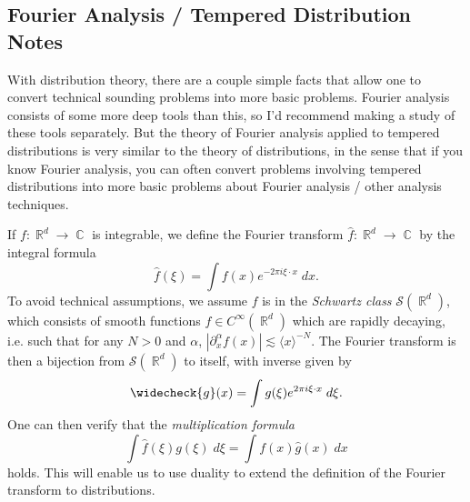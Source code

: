 \documentclass[answers]{exam}
\DeclareMathOperator{\CC}{\mathbb{C}}
\DeclareMathOperator{\RR}{\mathbb{R}}
\begin{document}
\begin{questions}
\newpage
\section{Fourier Analysis / Tempered Distribution Notes}

With distribution theory, there are a couple simple facts that allow one to convert technical sounding problems into more basic problems. Fourier analysis consists of some more deep tools than this, so I'd recommend making a study of these tools separately. But the theory of Fourier analysis applied to tempered distributions is very similar to the theory of distributions, in the sense that if you know Fourier analysis, you can often convert problems involving tempered distributions into more basic problems about Fourier analysis / other analysis techniques.

If $f: \RR^d \to \CC$ is integrable, we define the Fourier transform $\widehat{f}: \RR^d \to \CC$ by the integral formula
%
\[ \widehat{f}(\xi) = \int f(x) e^{-2 \pi i \xi \cdot x}\; dx. \]
%
To avoid technical assumptions, we assume $f$ is in the \emph{Schwartz class} $\mathcal{S}(\RR^d)$, which consists of smooth functions $f \in C^\infty(\RR^d)$ which are rapidly decaying, i.e. such that for any $N > 0$ and $\alpha$, $|\partial_x^\alpha f(x)| \lesssim \langle x \rangle^{-N}$. The Fourier transform is then a bijection from $\mathcal{S}(\RR^d)$ to itself, with inverse given by
%
\[ \widecheck{g}(x) = \int g(\xi) e^{2 \pi i \xi \cdot x}\; d \xi. \]
%
One can then verify that the \emph{multiplication formula}
%
\[ \int \widehat{f}(\xi) g(\xi)\; d\xi = \int f(x) \widehat{g}(x)\; dx \]
%
holds. This will enable us to use duality to extend the definition of the Fourier transform to distributions.


\end{questions}
\end{document}

